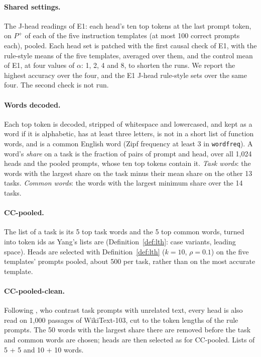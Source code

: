 \documentclass[11pt,a4paper]{article}
\begin{document}
\paragraph{Shared settings.} The J-head readings of E1: each head's ten top tokens at the last prompt token, on $P^{+}$ of each of the five instruction templates (at most 100 correct prompts each), pooled. Each head set is patched with the first causal check of E1, with the rule-style means of the five templates, averaged over them, and the control mean of E1, at four values of $\alpha$: 1, 2, 4 and 8, to shorten the runs. We report the highest accuracy over the four, and the E1 J-head rule-style sets over the same four. The second check is not run.

\paragraph{Words decoded.} Each top token is decoded, stripped of whitespace and lowercased, and kept as a word if it is alphabetic, has at least three letters, is not in a short list of function words, and is a common English word (Zipf frequency at least 3 in \texttt{wordfreq}). A word's \emph{share} on a task is the fraction of pairs of prompt and head, over all 1{,}024 heads and the pooled prompts, whose ten top tokens contain it. \emph{Task words}: the words with the largest share on the task minus their mean share on the other 13 tasks. \emph{Common words}: the words with the largest minimum share over the 14 tasks.

\paragraph{CC-pooled.} The list of a task is its 5 top task words and the 5 top common words, turned into token ids as Yang's lists are (Definition~\ref{def:lth}: case variants, leading space). Heads are selected with Definition~\ref{def:lth} ($k=10$, $\rho=0.1$) on the five templates' prompts pooled, about 500 per task, rather than on the most accurate template.

\paragraph{CC-pooled-clean.} Following \citet{davidson2025different}, who contrast task prompts with unrelated text, every head is also read on 1{,}000 passages of WikiText-103, cut to the token lengths of the rule prompts. The 50 words with the largest share there are removed before the task and common words are chosen; heads are then selected as for CC-pooled. Lists of 5 + 5 and 10 + 10 words.
\end{document}

